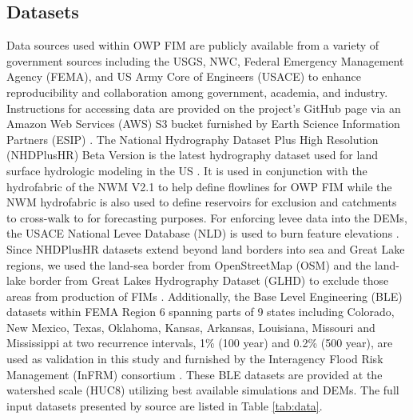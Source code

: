 \documentclass[draft]{dependencies/agujournal2019}
\begin{document}
\subsection{Datasets}
\label{ssec:datasets}
%
Data sources used within OWP FIM are publicly available from a variety of government sources including the USGS, NWC, Federal Emergency Management Agency (FEMA), and US Army Core of Engineers (USACE) to enhance reproducibility and collaboration among government, academia, and industry.
Instructions for accessing data are provided on the project's GitHub page via an Amazon Web Services (AWS) S3 bucket furnished by Earth Science Information Partners (ESIP) \cite{esipData2022}.
The National Hydrography Dataset Plus High Resolution (NHDPlusHR) Beta Version is the latest hydrography dataset used for land surface hydrologic modeling in the US \cite{moore2019user}. 
It is used in conjunction with the hydrofabric of the NWM V2.1 to help define flowlines for OWP FIM while the NWM hydrofabric is also used to define reservoirs for exclusion and catchments to cross-walk to for forecasting purposes.
For enforcing levee data into the DEMs, the USACE National Levee Database (NLD) is used to burn feature elevations \cite{engineers2016national}.
Since NHDPlusHR datasets extend beyond land borders into sea and Great Lake regions, we used the land-sea border from OpenStreetMap (OSM) and the land-lake border from Great Lakes Hydrography Dataset (GLHD) to exclude those areas from production of FIMs \cite{OpenStreetMap,GreatLakesHydrographyDataset}.
Additionally, the Base Level Engineering (BLE) datasets within FEMA Region 6 spanning parts of 9 states including Colorado, New Mexico, Texas, Oklahoma, Kansas, Arkansas, Louisiana, Missouri and Mississippi at two recurrence intervals, 1\% (100 year) and 0.2\% (500 year), are used as validation in this study and furnished by the Interagency Flood Risk Management (InFRM) consortium \cite{fema2021base,fema2021estimated}. 
These BLE datasets are provided at the watershed scale (HUC8) utilizing best available simulations and DEMs.
The full input datasets presented by source are listed in Table \ref{tab:data}.
%
\end{document}
